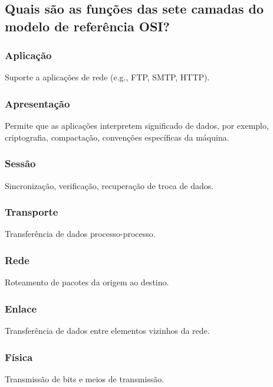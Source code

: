 \subsection{Quais são as funções das sete camadas do modelo de
\newline referência OSI?}

\subsubsection{Aplicação}

Suporte a aplicações de rede (e.g., FTP, SMTP, HTTP).

\subsubsection{Apresentação}

Permite que as aplicações interpretem significado de
dados, por exemplo, criptografia, compactação, convenções específicas
da máquina.

\subsubsection{Sessão}

Sincronização, verificação, recuperação de troca de dados.

\subsubsection{Transporte}

Transferência de dados processo-processo.

\subsubsection{Rede}

Roteamento de pacotes da origem ao destino.

\subsubsection{Enlace}

Transferência de dados entre elementos vizinhos da rede.

\subsubsection{Física}

Transmissão de bits e meios de transmissão.

